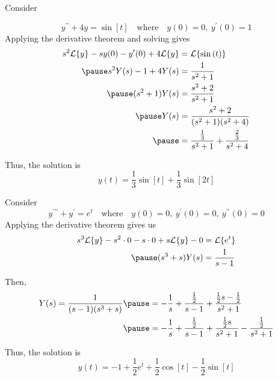 \documentclass{beamer}
\begin{document}
\begin{frame}
\begin{example}
Consider

\vspace{-5mm}
\begin{equation*}
y^{\prime\prime}+4y=\sin[t]
\quad\text{where}\quad
y(0)=0,~y^\prime(0)=1
\end{equation*}\pause
Applying the derivative theorem and solving gives
\begin{equation*}
\begin{aligned}
s^2\laplace\{y\}-sy(0)-y^\prime(0)+4\laplace\{y\} &= \laplace\{\sin[t]\}\\\pause
s^2 Y(s)-1+4 Y(s) &= \dfrac{1}{s^2+1}\\\pause
(s^2+1) Y(s) &= \dfrac{s^2+2}{s^2+1}\\\pause
Y(s) &= \dfrac{s^2+2}{(s^2+1)(s^2+4)}\\\pause
&=\dfrac{\tfrac{1}{3}}{s^2+1}+\dfrac{\tfrac{2}{3}}{s^2+4}
\end{aligned}
\end{equation*}\pause

\vspace{-8mm}
Thus, the solution is
\begin{equation*}
y(t)=\dfrac{1}{3}\sin[t]+\dfrac{1}{3}\sin[2t]
\end{equation*}
\end{example}
\end{frame}

\begin{frame}
\begin{example}
Consider
\begin{equation*}
y^{\prime\prime\prime}+y^\prime=e^t
\quad\text{where}\quad
y(0)=0,~y^\prime(0)=0,~y^{\prime\prime}(0)=0
\end{equation*}\pause
Applying the derivative theorem gives us
\begin{equation*}
\begin{aligned}
s^3\laplace\{y\}-s^2\cdot 0-s\cdot 0+s\laplace\{y\}-0&=\laplace\{e^t\}\\\pause
(s^3+s) Y(s) &= \dfrac{1}{s-1}
\end{aligned}
\end{equation*}\pause

\vspace{-8mm}
Then,
\begin{equation*}
\begin{aligned}
Y(s)=\dfrac{1}{(s-1)(s^3+s)}\pause
&=-\dfrac{1}{s}+\dfrac{\tfrac{1}{2}}{s-1}+\dfrac{\tfrac{1}{2}s-\tfrac{1}{2}}{s^2+1}\\\pause
&=-\dfrac{1}{s}+\dfrac{\tfrac{1}{2}}{s-1}+\dfrac{\tfrac{1}{2}s}{s^2+1}-\dfrac{\tfrac{1}{2}}{s^2+1}
\end{aligned}
\end{equation*}\pause

\vspace{-6mm}
Thus, the solution is
\begin{equation*}
y(t)=-1+\dfrac{1}{2}e^{t}+\dfrac{1}{2}\cos[t]-\dfrac{1}{2}\sin[t]
\end{equation*}
\end{example}
\end{frame}
\end{document}
